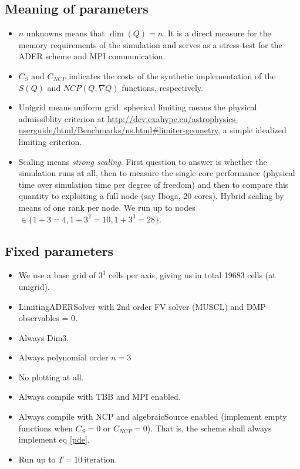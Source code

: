 \documentclass{article}
\begin{document}
\subsection{Meaning of parameters}
\begin{itemize}
\item $n$ unknowns means that $\dim(Q)=n$. It is a direct measure
for the memory requirements of the simulation and serves as a
stress-test for the ADER scheme and MPI communication.

\item $C_S$ and $C_{NCP}$ indicates the costs of the synthetic
implementation of the $S(Q)$ and $NCP(Q,\nabla Q)$ functions,
respectively.

\item Unigrid means uniform grid. spherical limiting means the
physical admissiblity criterion at
\url{http://dev.exahype.eu/astrophysics-userguide/html/Benchmarks/ns.html#limiter-geometry},
a simple idealized limiting criterion.

\item Scaling means \emph{strong scaling}. First question to answer
is whether the simulation runs at all, then to measure the single
core performance (physical time over simulation time per degree
of freedom) and then to compare this quantity to exploiting a
full node (say Iboga, 20 cores). Hybrid scaling by means of one
rank per node. We run up to nodes
$\in \{ 1+3 = 4, 1+3^2 = 10, 1+3^3 = 28 \}$.
\end{itemize}

\subsection{Fixed parameters}
\begin{itemize}
\item  We use a base grid of $3^3$ cells per axis, giving us in total 19683 cells (at unigrid).
\item  LimitingADERSolver with 2nd order FV solver (MUSCL) and DMP observables = 0.
\item  Always Dim3.
\item  Always polynomial order $n=3$
\item  No plotting at all.
\item  Always compile with TBB and MPI enabled.
\item  Always compile with NCP and algebraicSource enabled
(implement empty functions when $C_S=0$ or $C_{NCP}=0$). That is,
the scheme shall always implement eq \eqref{pde}.
\item  Run up to $T = 10 ~\text{iteration}$.
\end{itemize}
\end{document}
